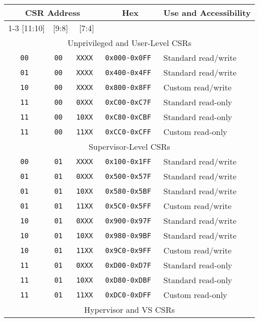 \begin{table*}[h!]
\begin{center}
\begin{tabular}{|c|c|c|c|l|}
\hline
\multicolumn{3}{|c|}{CSR Address} & Hex & \multicolumn{1}{c|}{Use and Accessibility}\\ \cline{1-3}
[11:10] & [9:8] & [7:4]                  &  & \\
\hline
\multicolumn{5}{|c|}{Unprivileged and User-Level CSRs}  \\
\hline
\tt   00   &\tt   00  &\tt   XXXX   & \tt 0x000-0x0FF & Standard read/write \\
\tt   01   &\tt   00  &\tt   XXXX   & \tt 0x400-0x4FF & Standard read/write \\
\tt   10   &\tt   00  &\tt   XXXX   & \tt 0x800-0x8FF & Custom read/write \\
\tt   11   &\tt   00  &\tt   0XXX   & \tt 0xC00-0xC7F & Standard read-only \\
\tt   11   &\tt   00  &\tt   10XX   & \tt 0xC80-0xCBF & Standard read-only \\
\tt   11   &\tt   00  &\tt   11XX   & \tt 0xCC0-0xCFF & Custom read-only \\
\hline
\multicolumn{5}{|c|}{Supervisor-Level CSRs}  \\
\hline
\tt   00   &\tt   01  &\tt   XXXX   & \tt 0x100-0x1FF & Standard read/write \\
\tt   01   &\tt   01  &\tt   0XXX   & \tt 0x500-0x57F & Standard read/write \\
\tt   01   &\tt   01  &\tt   10XX   & \tt 0x580-0x5BF & Standard read/write \\
\tt   01   &\tt   01  &\tt   11XX   & \tt 0x5C0-0x5FF & Custom read/write \\
\tt   10   &\tt   01  &\tt   0XXX   & \tt 0x900-0x97F & Standard read/write \\
\tt   10   &\tt   01  &\tt   10XX   & \tt 0x980-0x9BF & Standard read/write \\
\tt   10   &\tt   01  &\tt   11XX   & \tt 0x9C0-0x9FF & Custom read/write \\
\tt   11   &\tt   01  &\tt   0XXX   & \tt 0xD00-0xD7F & Standard read-only \\
\tt   11   &\tt   01  &\tt   10XX   & \tt 0xD80-0xDBF & Standard read-only \\
\tt   11   &\tt   01  &\tt   11XX   & \tt 0xDC0-0xDFF & Custom read-only \\
\hline
\multicolumn{5}{|c|}{Hypervisor and VS CSRs} \\

\end{tabular}
\end{center}
\end{table*}
